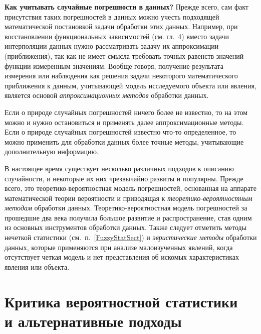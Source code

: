 \documentclass[a5paper,openany]{book}
\begin{document}
{{%
{\bf Как учитывать случайные погрешности в данных?}
Прежде всего, сам факт присутствия таких погрешностей в данных можно учесть подходящей 
математической постановкой задачи обработки этих данных. Например, при восстановлении 
функциональных зависимостей (см. гл.~4) вместо задачи интерполяции данных нужно 
рассматривать задачу их аппроксимации (приближения), так как не имеет смысла требовать 
точных равенств значений функции измеренным значениям. Вообще говоря, получение результата 
измерения или наблюдения как решения задачи некоторого математического приближения 
к данным, учитывающей модель исследуемого объекта или явления, является основой 
\emph{аппроксимационных методов}  
обработки данных.   

Если о природе случайных погрешностей ничего более не известно, то на этом можно 
и нужно остановиться и применять далее аппроксимационные методы. Если о природе 
случайных погрешностей известно что-то определенное, то можно применить для обработки 
данных более точные методы, учитывающие дополнительную информацию. 

В настоящее время существует несколько различных подходов к описанию 
случайности, и некоторые их них чрезвычайно развиты и популярны. Прежде всего, 
это теоретико-вероятностная модель погрешностей, основанная на аппарате математической 
теории вероятности и приводящая к \emph{теоретико-вероятностным методам} обработки 
данных. 
Теоретико-вероятностная модель погрешностей за прошедшие два 
века получила большое развитие и распространение, став одним из основных 
инструментов обработки данных. Также следует отметить методы нечеткой статистики 
(см.~п.~\ref{FuzzyStatSect}) 
и \emph{эвристические методы} обработки данных, которые 
применяются при анализе малоизученных явлений, когда отсутствует четкая модель и нет 
представления об искомых характеристиках явления или объекта.  

	\section{Критика вероятностной статистики \\  и альтернативные подходы} 

}}
\end{document}
